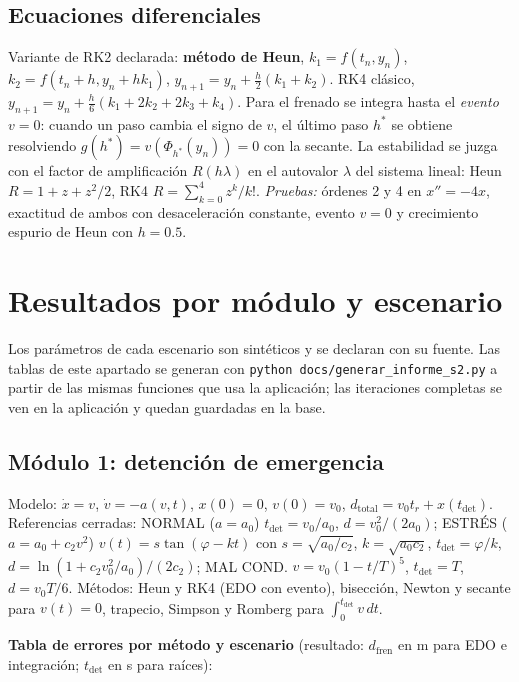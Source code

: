 \documentclass[11pt,letterpaper]{article}
\begin{document}
\subsection{Ecuaciones diferenciales}
Variante de RK2 declarada: \textbf{método de Heun}, $k_1=f(t_n,y_n)$, $k_2=f(t_n+h,y_n+hk_1)$, $y_{n+1}=y_n+\tfrac h2(k_1+k_2)$. RK4 clásico, $y_{n+1}=y_n+\tfrac h6(k_1+2k_2+2k_3+k_4)$. Para el frenado se integra hasta el \emph{evento} $v=0$: cuando un paso cambia el signo de $v$, el último paso $h^*$ se obtiene resolviendo $g(h^*)=v(\Phi_{h^*}(y_n))=0$ con la secante. La estabilidad se juzga con el factor de amplificación $R(h\lambda)$ en el autovalor $\lambda$ del sistema lineal: Heun $R=1+z+z^2/2$, RK4 $R=\sum_{k=0}^4 z^k/k!$. \textit{Pruebas:} órdenes 2 y 4 en $x''=-4x$, exactitud de ambos con desaceleración constante, evento $v=0$ y crecimiento espurio de Heun con $h=0.5$.

\section{Resultados por módulo y escenario}
Los parámetros de cada escenario son sintéticos y se declaran con su fuente. Las tablas de este apartado se generan con \texttt{python docs/generar\_informe\_s2.py} a partir de las mismas funciones que usa la aplicación; las iteraciones completas se ven en la aplicación y quedan guardadas en la base.

\subsection{Módulo 1: detención de emergencia}
Modelo: $\dot x=v$, $\dot v=-a(v,t)$, $x(0)=0$, $v(0)=v_0$, $d_{\mathrm{total}}=v_0t_r+x(t_{\mathrm{det}})$. Referencias cerradas: NORMAL ($a=a_0$) $t_{\mathrm{det}}=v_0/a_0$, $d=v_0^2/(2a_0)$; ESTRÉS ($a=a_0+c_2v^2$) $v(t)=s\tan(\varphi-kt)$ con $s=\sqrt{a_0/c_2}$, $k=\sqrt{a_0c_2}$, $t_{\mathrm{det}}=\varphi/k$, $d=\ln(1+c_2v_0^2/a_0)/(2c_2)$; MAL COND. $v=v_0(1-t/T)^5$, $t_{\mathrm{det}}=T$, $d=v_0T/6$. Métodos: Heun y RK4 (EDO con evento), bisección, Newton y secante para $v(t)=0$, trapecio, Simpson y Romberg para $\int_0^{t_{\mathrm{det}}}v\,dt$.


\textbf{Tabla de errores por método y escenario} (resultado: $d_{\mathrm{fren}}$ en m para EDO e integración; $t_{\mathrm{det}}$ en s para raíces):

\end{document}
